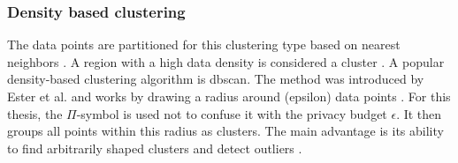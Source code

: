 
\subsubsection{Density based clustering}
The data points are partitioned for this clustering type based on nearest neighbors \citep{fahad_survey_2014}.
A region with a high data density is considered a cluster \citep{xu_comprehensive_2015}.
A popular density-based clustering algorithm is \gls{dbscan}.
The method was introduced by Ester et al. and works by drawing a radius around (epsilon) data points \citep{ester_density-based_nodate}.
For this thesis, the $\Pi$-symbol is used not to confuse it with the privacy budget $\epsilon$.
It then groups all points within this radius as clusters.
The main advantage is its ability to find arbitrarily shaped clusters and detect outliers \citep{liu_privacy_2012}.

